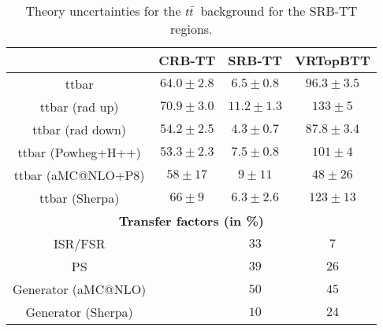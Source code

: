 \begin{description}
 \begin{table}[!h]
    \begin{center} \footnotesize
      \begin{tabular}{|c|c|c|c|}
        \hline
        & CRB-TT & SRB-TT & VRTopBTT\\
        \hline
        ttbar&   $64.0\pm 2.8 $&         $6.5\pm 0.8 $&          $96.3\pm 3.5 $\\
        ttbar (rad up)&          $70.9\pm 3.0 $&         $11.2\pm 1.3 $&         $133\pm 5 $\\
        ttbar (rad down)&        $54.2\pm 2.5 $&         $4.3\pm 0.7 $&          $87.8\pm 3.4 $\\
        ttbar (Powheg+H++)&      $53.3\pm 2.3 $&         $7.5\pm 0.8 $&          $101\pm 4 $\\
        ttbar (aMC@NLO+P8)&      $58\pm 17 $&    $9\pm 11 $&     $48\pm 26 $\\
        ttbar (Sherpa)&          $66\pm 9 $&     $6.3\pm 2.6 $&          $123\pm 13 $\\
        \hline
        \multicolumn{4}{c}{\bf Transfer factors (in \%)} \\ \hline
        ISR/FSR &   &     $33$&   $7$\\
        PS &   &     $39$&   $26$\\
        Generator (aMC@NLO) &  & $50$ & $45$\\
        Generator (Sherpa) & & $10$ & $24$\\        
        \hline       
        \end{tabular}
    \end{center}
    \caption{Theory uncertainties for the $t\bar{t}$\ background for the SRB-TT regions. }
    \label{tab:ttbar_unc_SRB_TT}
  \end{table}



\end{description}
